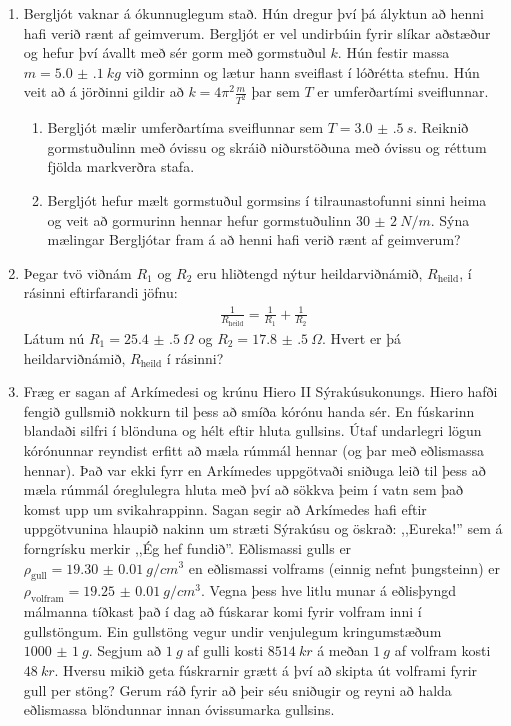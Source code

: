 \begin{enumerate}[label = \textbf{Dæmi \thechapter.\arabic*.}]
\item Bergljót vaknar á ókunnuglegum stað. Hún dregur því þá ályktun að henni hafi verið rænt af geimverum. Bergljót er vel undirbúin fyrir slíkar aðstæður og hefur því ávallt með sér gorm með gormstuðul $k$. Hún festir massa $m = \SI{5.0(1)}{kg}$ við gorminn og lætur hann sveiflast í lóðrétta stefnu. Hún veit að á jörðinni gildir að $k = 4\pi^2\frac{m}{T^2}$ þar sem $T$ er umferðartími sveiflunnar.
\begin{enumerate}[label = \textbf{(\alph*)}]
    \item Bergljót mælir umferðartíma sveiflunnar sem $T = \SI{3.0(5)}{s}$. Reiknið gormstuðulinn með óvissu og skráið niðurstöðuna með óvissu og réttum fjölda markverðra stafa.
    
    \item Bergljót hefur mælt gormstuðul gormsins í tilraunastofunni sinni heima og veit að gormurinn hennar hefur gormstuðulinn $\SI{30(2)}{N/m}$. Sýna mælingar Bergljótar fram á að henni hafi verið rænt af geimverum?
\end{enumerate}

\item Þegar tvö viðnám $R_1$ og $R_2$ eru hliðtengd nýtur heildarviðnámið, $R_{\text{heild}}$, í rásinni eftirfarandi jöfnu:
\begin{align*}
    \frac{1}{R_{\text{heild}}} = \frac{1}{R_1} + \frac{1}{R_2}
\end{align*}
Látum nú $R_1 = \SI{25.4(5)}{\Omega}$ og $R_2 = \SI{17.8(5)}{\Omega}$. Hvert er þá heildarviðnámið, $R_{\text{heild}}$ í rásinni?

\item Fræg er sagan af Arkímedesi og krúnu Hiero II Sýrakúsukonungs. Hiero hafði fengið gullsmið nokkurn til þess að smíða kórónu handa sér. En fúskarinn blandaði silfri í blönduna og hélt eftir hluta gullsins. Útaf undarlegri lögun kórónunnar reyndist erfitt að mæla rúmmál hennar (og þar með eðlismassa hennar). Það var ekki fyrr en Arkímedes uppgötvaði sniðuga leið til þess að mæla rúmmál óreglulegra hluta með því að sökkva þeim í vatn sem það komst upp um svikahrappinn.
Sagan segir að Arkímedes hafi eftir uppgötvunina hlaupið nakinn um stræti Sýrakúsu og öskrað: ,,Eureka!'' sem á forngrísku merkir ,,Ég hef fundið''. Eðlismassi gulls er $\rho_\text{gull} =  \SI{19.30(1)}{g/cm^3}$ en eðlismassi volframs (einnig nefnt þungsteinn) er $\rho_{\text{volfram}} = \SI{19.25(1)}{g/cm^3}$. Vegna þess hve litlu munar á eðlisþyngd málmanna tíðkast það í dag að fúskarar komi fyrir volfram inni í gullstöngum. Ein gullstöng vegur undir venjulegum kringumstæðum $\SI{1000(1)}{g}$.
Segjum að $\SI{1}{g}$ af gulli kosti $\SI{8514}{kr}$ á meðan $\SI{1}{g}$ af volfram kosti $\SI{48}{kr}$. Hversu mikið geta fúskrarnir grætt á því að skipta út volframi fyrir gull per stöng? Gerum ráð fyrir að þeir séu sniðugir og reyni að halda eðlismassa blöndunnar innan óvissumarka gullsins.

\end{enumerate}

\newpage